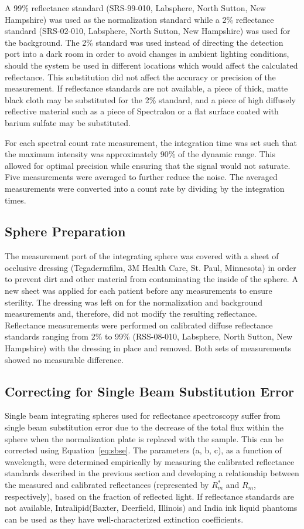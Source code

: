 A 99\% reflectance standard (SRS-99-010, Labsphere, North Sutton, New Hampshire) was used as the normalization standard while a 2\% reflectance standard (SRS-02-010, Labsphere, North Sutton, New Hampshire) was used for the background. The 2\% standard was used instead of directing the detection port into a dark room in order to avoid changes in ambient lighting conditions, should the system be used in different locations which would affect the calculated reflectance. This substitution did not affect the accuracy or precision of the measurement. If reflectance standards are not available, a piece of thick, matte black cloth may be substituted for the 2\% standard, and a piece of high diffusely reflective material such as a piece of Spectralon or a flat surface coated with barium sulfate may be substituted.

For each spectral count rate measurement, the integration time was set such that the maximum intensity was approximately 90\% of the dynamic range. This allowed for optimal precision while ensuring that the signal would not saturate. Five measurements were averaged to further reduce the noise. The averaged measurements were converted into a count rate by dividing by the integration times.

\subsection{Sphere Preparation}
The measurement port of the integrating sphere was covered with a sheet of occlusive dressing (Tegaderm\texttrademark film, 3M Health Care, St. Paul, Minnesota) in order to prevent dirt and other material from contaminating the inside of the sphere. A new sheet was applied for each patient before any measurements to ensure sterility. The dressing was left on for the normalization and background measurements and, therefore, did not modify the resulting reflectance. Reflectance measurements were performed on calibrated diffuse reflectance standards ranging from 2\% to 99\% (RSS-08-010, Labsphere, North Sutton, New Hampshire) with the dressing in place and removed. Both sets of measurements showed no measurable difference.

\subsection{Correcting for Single Beam Substitution Error}
Single beam integrating spheres used for reflectance spectroscopy suffer from single beam substitution error\cite{Springsteen1998,Labspherec} due to the decrease of the total flux within the sphere when the normalization plate is replaced with the sample. This can be corrected using Equation~\ref{eq:sbse}. The parameters (a, b, c), as a function of wavelength, were determined empirically by measuring the calibrated reflectance standards described in the previous section and developing a relationship between the measured and calibrated reflectances (represented by $R_m^\ast$ and $R_m$, respectively), based on the fraction of reflected light. If reflectance standards are not available, Intralipid\texttrademark (Baxter, Deerfield, Illinois) and India ink liquid phantoms can be used as they have well-characterized extinction coefficients.\cite{Flock1992,Madsen1992}

